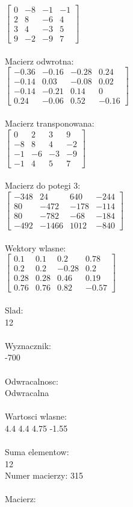 \documentclass[a4paper,12pt]{article}
\begin{document}
$\begin{bmatrix} 0&-8&-1&-1\\2&8&-6&4\\3&4&-3&5\\9&-2&-9&7 \end{bmatrix}$
\\
\\
Macierz odwrotna:\\

$\begin{bmatrix} -0.36&-0.16&-0.28&0.24\\-0.14&0.03&-0.08&0.02\\-0.14&-0.21&0.14&0\\0.24&-0.06&0.52&-0.16 \end{bmatrix}$
\\
\\
Macierz transponowana:\\

$\begin{bmatrix} 0&2&3&9\\-8&8&4&-2\\-1&-6&-3&-9\\-1&4&5&7 \end{bmatrix}$
\\
\\
Macierz do potegi 3:\\

$\begin{bmatrix} -348&24&640&-244\\80&-472&-178&-114\\80&-782&-68&-184\\-492&-1466&1012&-840 \end{bmatrix}$
\\
\\
Wektory wlasne:\\

$\begin{bmatrix} 0.1&0.1&0.2&0.78\\0.2&0.2&-0.28&0.2\\0.28&0.28&0.46&0.19\\0.76&0.76&0.82&-0.57 \end{bmatrix}$
\\
\\
Slad:\\
12
\\
\\
Wyznacznik:\\
-700
\\
\\
Odwracalnosc:\\
Odwracalna
\\
\\
Wartosci wlasne:\\
4.4 4.4 4.75 -1.55
\\
\\
Suma elementow:\\
12
\\
\newpage
Numer macierzy:
315
\\
\\
Macierz:\\
\end{document}
